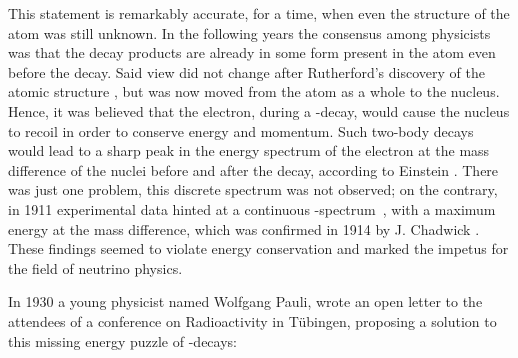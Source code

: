 This statement is remarkably accurate, for a time, when even the structure of the atom was still unknown. In the following years the consensus among physicists was that the decay products are already in some form present in the atom even before the decay. Said view did not change after Rutherford's discovery of the atomic structure \cite{RutherfordScattering}, but was now moved from the atom as a whole to the nucleus. Hence, it was believed that the electron, during a \textbeta-decay, would cause the nucleus to recoil in order to conserve energy and momentum. Such two-body decays would lead to a sharp peak in the energy spectrum of the electron at the mass difference of the nuclei before and after the decay, according to Einstein \cite{SpecialRelativity}. There was just one problem, this discrete spectrum was not observed; on the contrary, in 1911 experimental data hinted at a continuous \textbeta-spectrum~\cite{BetaSpectrum1}, with a maximum energy at the mass difference, which was confirmed in 1914 by J. Chadwick \cite{BetaSpectrum2}. These findings seemed to violate energy conservation and marked the impetus for the field of neutrino physics.

In 1930 a young physicist named Wolfgang Pauli, wrote an open letter to the attendees of a conference on Radioactivity in T\"ubingen, proposing a solution to this missing energy puzzle of \textbeta-decays:\\

